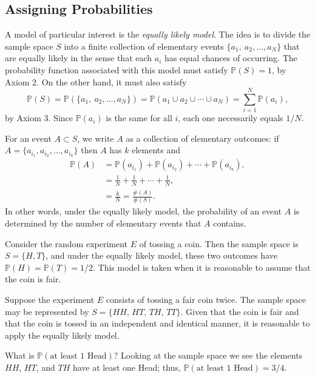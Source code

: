 \subsection{Assigning Probabilities}
\label{sec-4-4-3}

A model of particular interest is the \emph{equally likely model}. The idea
is to divide the sample space \(S\) into a finite collection of
elementary events \( \{ a_{1},\ a_{2}, \ldots, a_{N} \} \) that are
equally likely in the sense that each \(a_{i}\) has equal chances of
occurring. The probability function associated with this model must
satisfy \(\mathbb{P}(S)=1\), by Axiom 2. On the other hand, it must
also satisfy \[ \mathbb{P}(S)=\mathbb{P}( \{ a_{1},\
a_{2},\ldots,a_{N} \} )=\mathbb{P}(a_{1}\cup a_{2}\cup\cdots\cup
a_{N})=\sum_{i=1}^{N}\mathbb{P}(a_{i}), \] by Axiom 3. Since
\(\mathbb{P}(a_{i})\) is the same for all \(i\), each one necessarily
equals \(1/N\).

For an event \(A\subset S\), we write \(A\) as a collection of
elementary outcomes: if \( A = \{ a_{i_{1}}, a_{i_{2}}, \ldots,
a_{i_{k}} \} \) then \(A\) has \(k\) elements and
\begin{align*}
\mathbb{P}(A) & =\mathbb{P}(a_{i_{1}})+\mathbb{P}(a_{i_{2}})+\cdots+\mathbb{P}(a_{i_{k}}),\\
 & =\frac{1}{N}+\frac{1}{N}+\cdots+\frac{1}{N},\\
 & =\frac{k}{N}=\frac{\#(A)}{\#(S)}.
\end{align*}
In other words, under the equally likely model, the probability of an
event \(A\) is determined by the number of elementary events that
\(A\) contains.


Consider the random experiment \(E\) of tossing a coin. Then the
sample space is \(S=\{H,T\}\), and under the equally likely model,
these two outcomes have \(\mathbb{P}(H)=\mathbb{P}(T)=1/2\). This
model is taken when it is reasonable to assume that the coin is fair.



Suppose the experiment \(E\) consists of tossing a fair coin
twice. The sample space may be represented by \(S=\{HH,\, HT,\, TH,\,
TT\}\). Given that the coin is fair and that the coin is tossed in an
independent and identical manner, it is reasonable to apply the
equally likely model.

What is \(\mathbb{P}(\mbox{at least 1 Head})\)? Looking at the sample
space we see the elements \(HH\), \(HT\), and \(TH\) have at least one
Head; thus, \(\mathbb{P}(\mbox{at least 1 Head})=3/4\).

